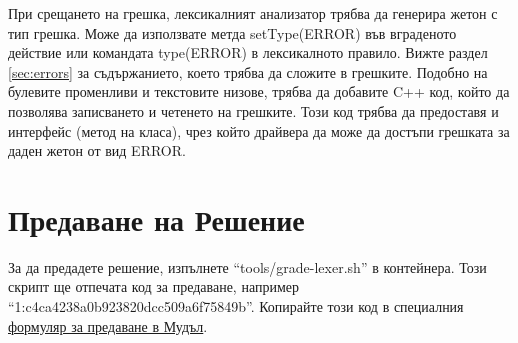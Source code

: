 \documentclass[11pt]{article}
\begin{document}
При срещането на грешка, лексикалният анализатор трябва да генерира жетон с тип грешка.
Може да използвате метда setType(ERROR) във вграденото действие или командата type(ERROR) в лексикалното правило.
Вижте раздел \ref{sec:errors} за съдържанието, което трябва да сложите в грешките.
Подобно на булевите променливи и текстовите низове, трябва да добавите C++ код, който да позволява записването и четенето на грешките.
Този код трябва да предоставя и интерфейс (метод на класа), чрез който драйвера да може да достъпи грешката за даден жетон от вид ERROR.

\section{Предаване на Решение}

За да предадете решение, изпълнете ``tools/grade-lexer.sh'' в контейнера.
Този скрипт ще отпечата код за предаване, например ``1:c4ca4238a0b923820dcc509a6f75849b''.
Копирайте този код в специалния \href{https://learn.fmi.uni-sofia.bg/mod/quiz/view.php?id=358624}{формуляр за предаване в Мудъл}.

\renewcommand{\notesname}{Бележки от Текста}
\theendnotes
\end{document}
